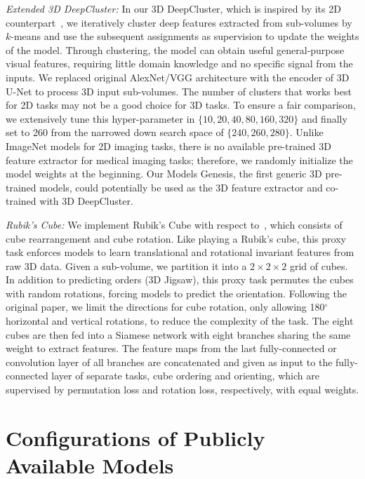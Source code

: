 \textit{Extended 3D DeepCluster:} In our 3D DeepCluster, which is inspired by its 2D counterpart~\citep{caron2018deep}, we iteratively cluster deep features extracted from sub-volumes by $k$-means and use the subsequent assignments as supervision to update the weights of the model. Through clustering, the model can obtain useful general-purpose visual features, requiring little domain knowledge and no specific signal from the inputs. We replaced original AlexNet/VGG architecture with the encoder of 3D U-Net to process 3D input sub-volumes. The number of clusters that works best for 2D tasks may not be a good choice for 3D tasks. To ensure a fair comparison, we extensively tune this hyper-parameter in $\{10,20,40,80,160,320\}$ and finally set to 260 from the narrowed down search space of $\{240,260,280\}$. Unlike ImageNet models for 2D imaging tasks, there is no available pre-trained 3D feature extractor for medical imaging tasks; therefore, we randomly initialize the model weights at the beginning. Our Models Genesis, the first generic 3D pre-trained models, could potentially be used as the 3D feature extractor and co-trained with 3D DeepCluster. 

\textit{Rubik's Cube:} We implement Rubik's Cube with respect to~\citet{zhuang2019self}, which consists of cube rearrangement and cube rotation. Like playing a Rubik's cube, this proxy task enforces models to learn translational and rotational invariant features from raw 3D data. Given a sub-volume, we partition it into a $2\times 2\times 2$ grid of cubes. In addition to predicting orders (3D Jigsaw), this proxy task permutes the cubes with random rotations, forcing models to predict the orientation. Following the original paper, we limit the directions for cube rotation, \ie only allowing 180$^{\circ}$ horizontal and vertical rotations, to reduce the complexity of the task. The eight cubes are then fed into a Siamese network with eight branches sharing the same weight to extract features. The feature maps from the last fully-connected or convolution layer of all branches are concatenated and given as input to the fully-connected layer of separate tasks, \ie cube ordering and orienting, which are supervised by permutation loss and rotation loss, respectively, with equal weights.

\section*{Configurations of Publicly Available Models}
\label{sec:public_3d_model_appendix}

